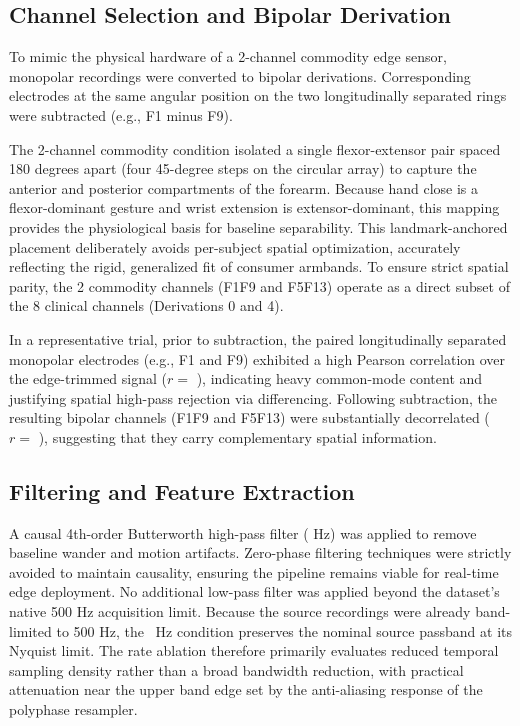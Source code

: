 \documentclass[preprint,12pt]{elsarticle}
\begin{document}
\subsection{Channel Selection and Bipolar Derivation}
To mimic the physical hardware of a 2-channel commodity edge sensor, monopolar recordings were converted to bipolar derivations. Corresponding electrodes at the same angular position on the two longitudinally separated rings were subtracted (e.g., F1 minus F9).

The 2-channel commodity condition isolated a single flexor-extensor pair spaced 180 degrees apart (four 45-degree steps on the circular array) to capture the anterior and posterior compartments of the forearm. Because hand close is a flexor-dominant gesture and wrist extension is extensor-dominant, this mapping provides the physiological basis for baseline separability. This landmark-anchored placement deliberately avoids per-subject spatial optimization, accurately reflecting the rigid, generalized fit of consumer armbands. To ensure strict spatial parity, the 2 commodity channels (F1F9 and F5F13) operate as a direct subset of the 8 clinical channels (Derivations 0 and 4).

In a representative trial, prior to subtraction, the paired longitudinally separated monopolar electrodes (e.g., F1 and F9) exhibited a high Pearson correlation over the edge-trimmed signal ($r =$ \rawCorr), indicating heavy common-mode content and justifying spatial high-pass rejection via differencing. Following subtraction, the resulting bipolar channels (F1F9 and F5F13) were substantially decorrelated ($r =$ \bipolarCorr), suggesting that they carry complementary spatial information.

\subsection{Filtering and Feature Extraction}
A causal 4th-order Butterworth high-pass filter (\hpCutoff{} Hz) was applied to remove baseline wander and motion artifacts. Zero-phase filtering techniques were strictly avoided to maintain causality, ensuring the pipeline remains viable for real-time edge deployment. No additional low-pass filter was applied beyond the dataset's native 500 Hz acquisition limit. Because the source recordings were already band-limited to 500 Hz, the \fsCommodity{}~Hz condition preserves the nominal source passband at its Nyquist limit. The rate ablation therefore primarily evaluates reduced temporal sampling density rather than a broad bandwidth reduction, with practical attenuation near the upper band edge set by the anti-aliasing response of the polyphase resampler.
\end{document}
